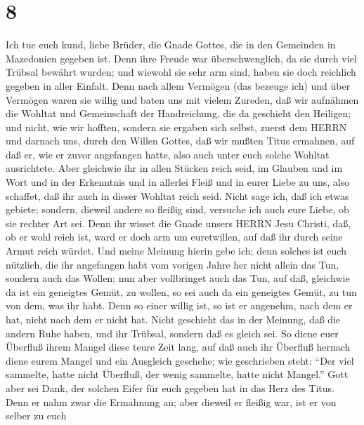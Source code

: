 \hypertarget{section-7}{%
\section{8}\label{section-7}}

 Ich tue euch kund, liebe Brüder, die Gnade Gottes, die in
den Gemeinden in Mazedonien gegeben ist.  Denn ihre Freude
war überschwenglich, da sie durch viel Trübsal bewährt wurden; und
wiewohl sie sehr arm sind, haben sie doch reichlich gegeben in aller
Einfalt.  Denn nach allem Vermögen (das bezeuge ich) und
über Vermögen waren sie willig  und baten uns mit vielem
Zureden, daß wir aufnähmen die Wohltat und Gemeinschaft der
Handreichung, die da geschieht den Heiligen;  und nicht, wie
wir hofften, sondern sie ergaben sich selbst, zuerst dem HERRN und
darnach uns, durch den Willen Gottes,  daß wir mußten Titus
ermahnen, auf daß er, wie er zuvor angefangen hatte, also auch unter
euch solche Wohltat ausrichtete.  Aber gleichwie ihr in
allen Stücken reich seid, im Glauben und im Wort und in der Erkenntnis
und in allerlei Fleiß und in eurer Liebe zu uns, also schaffet, daß ihr
auch in dieser Wohltat reich seid.  Nicht sage ich, daß ich
etwas gebiete; sondern, dieweil andere so fleißig sind, versuche ich
auch eure Liebe, ob sie rechter Art sei.  Denn ihr wisset
die Gnade unsers HERRN Jesu Christi, daß, ob er wohl reich ist, ward er
doch arm um euretwillen, auf daß ihr durch seine Armut reich würdet.
 Und meine Meinung hierin gebe ich; denn solches ist euch
nützlich, die ihr angefangen habt vom vorigen Jahre her nicht allein das
Tun, sondern auch das Wollen;  nun aber vollbringet auch
das Tun, auf daß, gleichwie da ist ein geneigtes Gemüt, zu wollen, so
sei auch da ein geneigtes Gemüt, zu tun von dem, was ihr habt.
 Denn so einer willig ist, so ist er angenehm, nach dem er
hat, nicht nach dem er nicht hat.  Nicht geschieht das in
der Meinung, daß die andern Ruhe haben, und ihr Trübsal, sondern daß es
gleich sei.  So diene euer Überfluß ihrem Mangel diese
teure Zeit lang, auf daß auch ihr Überfluß hernach diene eurem Mangel
und ein Ausgleich geschehe;  wie geschrieben steht: ``Der
viel sammelte, hatte nicht Überfluß, der wenig sammelte, hatte nicht
Mangel.''  Gott aber sei Dank, der solchen Eifer für euch
gegeben hat in das Herz des Titus.  Denn er nahm zwar die
Ermahnung an; aber dieweil er fleißig war, ist er von selber zu euch
